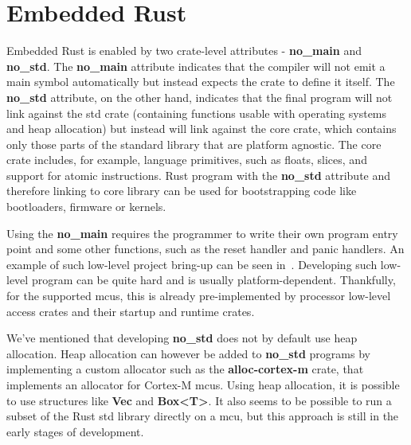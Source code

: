 \section{Embedded Rust}
\label{sec:embedded_rust}
Embedded Rust is enabled by two crate-level attributes - \textbf{no\_main} and \textbf{no\_std}.
The \textbf{no\_main} attribute indicates that the compiler will not emit a main symbol automatically but instead expects the crate to define it itself\cite{noauthor_crates_2021}.
The \textbf{no\_std} attribute, on the other hand, indicates that the final program will not link against the std crate (containing functions usable with operating systems and heap allocation) but instead will link against the core crate, which contains only those parts of the standard library that are platform agnostic.
The core crate includes, for example, language primitives, such as floats, slices, and support for atomic instructions.
Rust program with the \textbf{no\_std} attribute and therefore linking to core library can be used for bootstrapping code like bootloaders, firmware or kernels\cite{rust_embedded_devices_wg_introduction_2021}.

Using the \textbf{no\_main} requires the programmer to write their own program entry point and some other functions, such as the reset handler and panic handlers.
An example of such low-level project bring-up can be seen in~\cite{munns_zero_2019}.
Developing such low-level program can be quite hard and is usually platform-dependent.
Thankfully, for the supported \acs{mcu}s, this is already pre-implemented by processor low-level access crates and their startup and runtime crates.

We've mentioned that developing \textbf{no\_std} does not by default use heap allocation.
Heap allocation can however be added to \textbf{no\_std} programs by implementing a custom allocator such as the \textbf{alloc-cortex-m} crate\cite{rust_embedded_devices_wg_rust-embeddedalloc-cortex-m_2021}, that implements an allocator for Cortex-M \acs{mcu}s.
Using heap allocation, it is possible to use structures like \textbf{Vec} and \textbf{Box<T>}\cite{noauthor_alloc_nodate}.
It also seems to be possible to run a subset of the Rust std library directly on a \acs{mcu}\cite{hutt_using_nodate}, but this approach is still in the early stages of development.

